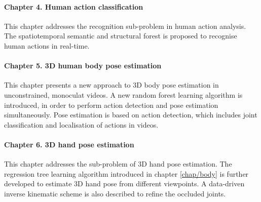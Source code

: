 \paragraph{Chapter 4. Human action classification} 
This chapter addresses the recognition sub-problem in human action analysis. The spatiotemporal semantic and structural forest is proposed to recognise human actions in real-time.    

\paragraph{Chapter 5. 3D human body pose estimation} 
This chapter presents a new approach to 3D body pose estimation in unconstrained, monoculat videos. 
A new random forest learning algorithm is introduced, in order to perform action detection and pose estimation simultaneously. 
Pose estimation is based on action detection, which includes joint classification and localisation of actions in videos. 

\paragraph{Chapter 6. 3D hand pose estimation} 
This chapter addresses the sub-problem of 3D hand pose estimation. 
The regression tree learning algorithm introduced in chapter \ref{chap/body} is further developed to estimate 3D hand pose from different viewpoints. 
A data-driven inverse kinematic scheme is also described to refine the occluded joints.
